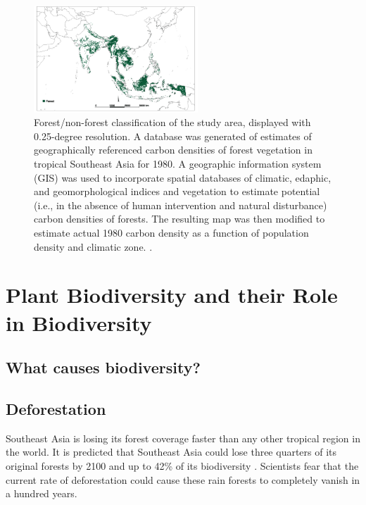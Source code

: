  
 \begin{figure}[ht]
    \centering
        \includegraphics[width = 0.55\textwidth]{graphics/forestcover.png}
        \caption{Forest/non-forest classification of the study area, displayed with 0.25-degree resolution. A database was generated of estimates of geographically referenced carbon densities of forest vegetation in tropical Southeast Asia for 1980. A geographic information system (GIS) was used to incorporate spatial databases of climatic, edaphic, and geomorphological indices and vegetation to estimate potential (i.e., in the absence of human intervention and natural disturbance) carbon densities of forests. The resulting map was then modified to estimate actual 1980 carbon density as a function of population density and climatic zone. \citep{brown1991biomass}.}
    \end{figure}



\section{Plant Biodiversity and their Role in Biodiversity}

\subsection{What causes biodiversity?}



\subsection{Deforestation}

Southeast Asia is losing its forest coverage faster than any other tropical region in the world. It is predicted that Southeast Asia could lose three quarters of its original forests by 2100 and up to 42\% of its biodiversity \citep{sodhi2004southeast}. Scientists fear that the current rate of deforestation could cause these rain forests to completely vanish in a hundred years. 

